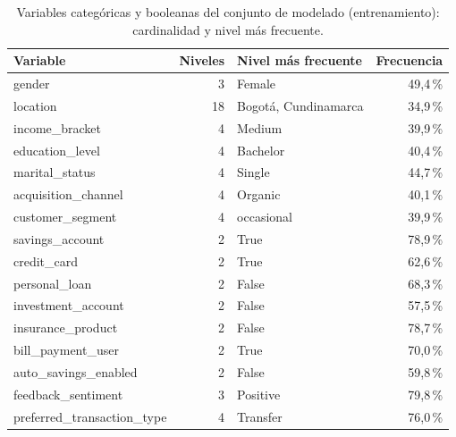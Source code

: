 \begin{table}[htbp]
\caption{Variables categóricas y booleanas del conjunto de modelado (entrenamiento): cardinalidad y nivel más frecuente.}\label{tab:categoricas}
\scriptsize\setlength{\tabcolsep}{2pt}
\begin{tabular}{lrlr}
\toprule
\textbf{Variable} & \textbf{Niveles} & \textbf{Nivel más frecuente} & \textbf{Frecuencia} \\
\midrule
gender & 3 & Female & 49,4\,\% \\
location & 18 & Bogotá, Cundinamarca & 34,9\,\% \\
income\_bracket & 4 & Medium & 39,9\,\% \\
education\_level & 4 & Bachelor & 40,4\,\% \\
marital\_status & 4 & Single & 44,7\,\% \\
acquisition\_channel & 4 & Organic & 40,1\,\% \\
customer\_segment & 4 & occasional & 39,9\,\% \\
savings\_account & 2 & True & 78,9\,\% \\
credit\_card & 2 & True & 62,6\,\% \\
personal\_loan & 2 & False & 68,3\,\% \\
investment\_account & 2 & False & 57,5\,\% \\
insurance\_product & 2 & False & 78,7\,\% \\
bill\_payment\_user & 2 & True & 70,0\,\% \\
auto\_savings\_enabled & 2 & False & 59,8\,\% \\
feedback\_sentiment & 3 & Positive & 79,8\,\% \\
preferred\_transaction\_type & 4 & Transfer & 76,0\,\% \\
\bottomrule
\end{tabular}
\end{table}
